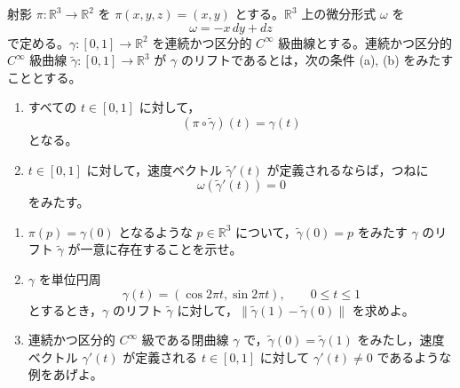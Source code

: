 \documentclass[12pt]{jlreq}
\newcommand{\R}{\mathbb{R}}
\begin{document}
射影 \(\pi:\R^3\to\R^2\) を \(\pi(x,y,z)=(x,y)\) とする。\(\R^3\) 上の微分形式 \(\omega\) を
\[
  \omega=-x\,dy+dz
\]
で定める。\(\gamma:[0,1]\to\R^2\) を連続かつ区分的 \(C^\infty\) 級曲線とする。連続かつ区分的 \(C^\infty\) 級曲線 \(\widetilde{\gamma}:[0,1]\to\R^3\) が \(\gamma\) のリフトであるとは，次の条件 (a), (b) をみたすこととする。
\begin{enumerate}
  \item[(a)] すべての \(t\in[0,1]\) に対して，
  \[
    (\pi\circ\widetilde{\gamma})(t)=\gamma(t)
  \]
  となる。
  \item[(b)] \(t\in[0,1]\) に対して，速度ベクトル \(\widetilde{\gamma}'(t)\) が定義されるならば，つねに
  \[
    \omega(\widetilde{\gamma}'(t))=0
  \]
  をみたす。
\end{enumerate}

\begin{enumerate}
  \item \(\pi(p)=\gamma(0)\) となるような \(p\in\R^3\) について，\(\widetilde{\gamma}(0)=p\) をみたす \(\gamma\) のリフト \(\widetilde{\gamma}\) が一意に存在することを示せ。
  \item \(\gamma\) を単位円周
  \[
    \gamma(t)=(\cos 2\pi t,\sin 2\pi t),\qquad 0\le t\le 1
  \]
  とするとき，\(\gamma\) のリフト \(\widetilde{\gamma}\) に対して，\(\|\widetilde{\gamma}(1)-\widetilde{\gamma}(0)\|\) を求めよ。
  \item 連続かつ区分的 \(C^\infty\) 級である閉曲線 \(\gamma\) で，\(\widetilde{\gamma}(0)=\widetilde{\gamma}(1)\) をみたし，速度ベクトル \(\gamma'(t)\) が定義される \(t\in[0,1]\) に対して \(\gamma'(t)\ne0\) であるような例をあげよ。
\end{enumerate}
\end{document}
